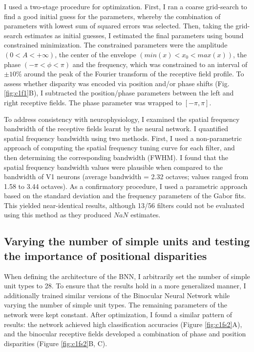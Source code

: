 I used a two-stage procedure for optimization. First, I ran a coarse grid-search to find a good initial guess for the parameters, whereby the combination of parameters with lowest sum of squared errors was selected. Then, taking the grid-search estimates as initial guesses, I estimated the final parameters using bound constrained minimization. The constrained parameters were the amplitude $(0<A<+\infty)$, the center of the envelope $(min(x)<x_0<max(x))$, the phase $(-\pi<\phi<\pi)$ and the frequency, which was constrained to an interval of $\pm 10\%$ around the peak of the Fourier transform of the receptive field profile. To assess whether disparity was encoded via position and/or phase shifts (Fig. \ref{fig:c1f1}B), I subtracted the position/phase parameters between the left and right receptive fields. The phase parameter was wrapped to $[-\pi,\pi]$. 

To address consistency with neurophysiology, I examined the spatial frequency bandwidth of the receptive fields learnt by the neural network. I quantified spatial frequency bandwidth using two methods. First, I used a non-parametric approach of computing the spatial frequency tuning curve for each filter, and then determining the corresponding bandwidth (FWHM). I found that the spatial frequency bandwidth values were plausible when compared to the bandwidth of V1 neurons \cite{De-Valois:1982fk} (average bandwidth = 2.32 octaves; values ranged from 1.58 to 3.44 octaves). As a confirmatory procedure, I used a parametric approach based on the standard deviation and the frequency parameters of the Gabor fits. This yielded near-identical results, although 13/56 filters could not be evaluated using this method as they produced $NaN$ estimates. 

\subsection*{Varying the number of simple units and testing the importance of positional disparities}

When defining the architecture of the BNN, I arbitrarily set the number of simple unit types to 28. To ensure that the results hold in a more generalized manner, I additionally trained similar versions of the Binocular Neural Network while varying the number of simple unit types. The remaining parameters of the network were kept constant. After optimization, I found a similar pattern of results: the network achieved high classification accuracies (Figure \ref{fig:c1fs2}A), and the binocular receptive fields developed a combination of phase and position disparities (Figure \ref{fig:c1fs2}B, C). 

